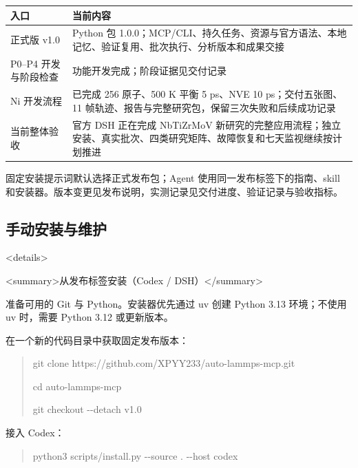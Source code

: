 \documentclass[11pt,a4paper]{ctexart}
\begin{document}
\begin{longtable}{p{7.25cm}p{7.25cm}}
\toprule
入口 & 当前内容 \\
\midrule\endhead
正式版 v1.0 & Python 包 1.0.0；MCP/\allowbreak{}CLI、持久任务、资源与官方语法、本地记忆、验证复用、批次执行、分析版本和成果交接 \\
P0–P4 开发与阶段检查 & 功能开发完成；阶段证据见交付记录 \\
Ni 开发流程 & 已完成 256 原子、500 K 平衡 5 ps、NVE 10 ps；交付五张图、11 帧轨迹、报告与完整研究包，保留三次失败和后续成功记录 \\
当前整体验收 & 官方 DSH 正在完成 NbTiZrMoV 新研究的完整应用流程；独立安装、真实批次、四类研究矩阵、故障恢复和七天监视继续按计划推进 \\
\bottomrule
\end{longtable}


固定安装提示词默认选择正式发布包；Agent 使用同一发布标签下的指南、skill 和安装器。版本变更见发布说明，实测记录见交付进度、验证记录与验收指标。



\subsection{手动安装与维护}


<details>

<summary>从发布标签安装（Codex /\allowbreak{} DSH）</\allowbreak{}summary>



准备可用的 Git 与 Python。安装器优先通过 uv 创建 Python 3.13 环境；不使用 uv 时，需要 Python 3.12 或更新版本。



在一个新的代码目录中获取固定发布版本：



\begin{quote}\small
git clone https:/\allowbreak{}/\allowbreak{}github.com/\allowbreak{}XPYY233/\allowbreak{}auto-lammps-mcp.git\par
cd auto-lammps-mcp\par
git checkout -{}-detach v1.0\par
\end{quote}


接入 Codex：



\begin{quote}\small
python3 scripts/\allowbreak{}install.py -{}-source . -{}-host codex\par
\end{quote}
\end{document}
